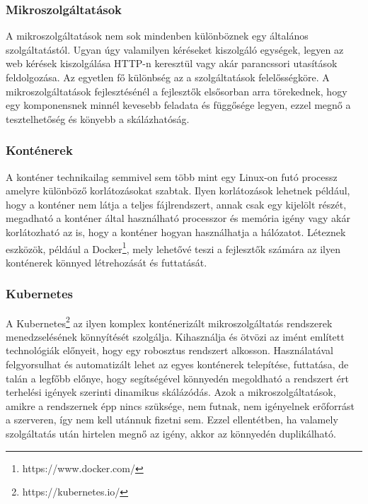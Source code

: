 \subsubsection{Mikroszolgáltatások}
A mikroszolgáltatások nem sok mindenben különböznek egy általános szolgáltatástól. 
Ugyan úgy valamilyen kéréseket kiszolgáló egységek, legyen az web kérések kiszolgálása HTTP-n keresztül
vagy akár parancssori utasítások feldolgozása. Az egyetlen fő különbség az a szolgáltatások felelősségköre.
A mikroszolgáltatások fejlesztésénél a fejlesztők elsősorban arra törekednek, hogy egy komponensnek minnél kevesebb feladata és függősége legyen, 
ezzel megnő a tesztelhetőség és könyebb a skálázhatóság.

\subsubsection{Konténerek}
A konténer technikailag semmivel sem több mint egy Linux-on futó processz amelyre különböző korlátozásokat szabtak.
Ilyen korlátozások lehetnek például, hogy a konténer nem látja a teljes fájlrendszert, annak csak egy kijelölt részét,
megadható a konténer által használható processzor és memória igény vagy akár korlátozható az is, hogy a konténer hogyan használhatja a hálózatot.
Léteznek eszközök, például a Docker\footnote{https://www.docker.com/}, mely lehetővé teszi a fejlesztők számára az ilyen konténerek könnyed létrehozását és futtatását.

\subsubsection{Kubernetes}
A Kubernetes\footnote{https://kubernetes.io/} az ilyen komplex konténerizált mikroszolgáltatás rendszerek menedzselésének könnyítését szolgálja.
Kihasználja és ötvözi az imént említett technológiák előnyeit, hogy egy robosztus rendszert alkosson. 
Használatával felgyorsulhat és automatizált lehet az egyes konténerek telepítése, futtatása, de talán a legfőbb előnye,
hogy segítségével könnyedén megoldható a rendszert ért terhelési igények szerinti dinamikus skálázódás. 
Azok a mikroszolgáltatások, amikre a rendszernek épp nincs szüksége, nem futnak, nem igényelnek erőforrást a szerveren,
így nem kell utánnuk fizetni sem. Ezzel ellentétben, ha valamely szolgáltatás után hirtelen megnő az igény,
akkor az könnyedén duplikálható.

